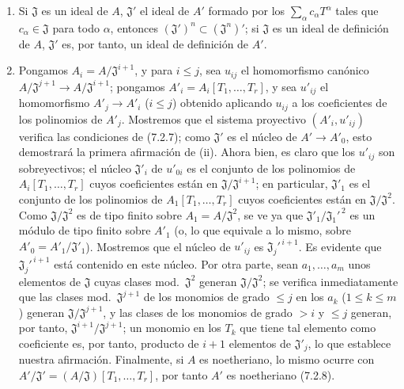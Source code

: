 \begin{enumerate}
  \item[(i)] Si $\mathfrak J$ es un ideal de $A$, $\mathfrak J'$ el ideal de
  $A'$ formado por los $\sum_\alpha c_\alpha T^\alpha$ tales que
  $c_\alpha\in\mathfrak J$ para todo $\alpha$, entonces
  $(\mathfrak J')^n\subset(\mathfrak J^n)'$; si $\mathfrak J$ es un ideal de
  definición de $A$, $\mathfrak J'$ es, por tanto, un ideal de definición de $A'$.

  \item[(ii)] Pongamos $A_i=A/\mathfrak J^{i+1}$, y para $i\leq j$, sea
  $u_{ij}$ el homomorfismo canónico
  $A/\mathfrak J^{j+1}\to A/\mathfrak J^{i+1}$; pongamos
  $A'_i=A_i[T_1,\ldots,T_r]$, y sea $u'_{ij}$ el homomorfismo
  $A'_j\to A'_i$ ($i\leq j$) obtenido aplicando $u_{ij}$ a los coeficientes
  de los polinomios de $A'_j$. Mostremos que el sistema proyectivo
  $(A'_i,u'_{ij})$ verifica las condiciones de (7.2.7); como $\mathfrak J'$ es
  el núcleo de $A'\to A'_0$, esto demostrará la primera afirmación de (ii). Ahora bien,
  es claro que los $u'_{ij}$ son sobreyectivos; el núcleo $\mathfrak J'_i$
  de $u'_{0i}$ es el conjunto de los polinomios de
  $A_i[T_1,\ldots,T_r]$ cuyos coeficientes están en
  $\mathfrak J/\mathfrak J^{i+1}$; en particular, $\mathfrak J'_1$ es
  el conjunto de los polinomios de $A_1[T_1,\ldots,T_r]$ cuyos coeficientes
  están en $\mathfrak J/\mathfrak J^2$. Como $\mathfrak J/\mathfrak J^2$
  es de tipo finito sobre $A_1=A/\mathfrak J^2$, se ve ya que
  $\mathfrak J'_1/\mathfrak J_1'^{\,2}$ es un módulo de tipo finito sobre $A'_1$
  (o, lo que equivale a lo mismo, sobre
  $A'_0=A'_1/\mathfrak J'_1$). Mostremos que el núcleo de $u'_{ij}$ es
  $\mathfrak J_j'^{\,i+1}$. Es evidente que
  $\mathfrak J_j'^{\,i+1}$ está contenido en este núcleo. Por otra parte, sean
  $a_1,\ldots,a_m$ unos elementos de $\mathfrak J$ cuyas clases
  mod.~$\mathfrak J^2$ generan $\mathfrak J/\mathfrak J^2$; se verifica
  inmediatamente que las clases mod.~$\mathfrak J^{j+1}$ de los monomios de grado
  $\leq j$ en los $a_k$ ($1\leq k\leq m$) generan
  $\mathfrak J/\mathfrak J^{j+1}$, y las clases de los monomios de grado $>i$
  y $\leq j$ generan, por tanto,
  $\mathfrak J^{i+1}/\mathfrak J^{j+1}$; un monomio en los $T_k$ que tiene tal
  elemento como coeficiente es, por tanto, producto de $i+1$ elementos de
  $\mathfrak J'_j$, lo que establece nuestra afirmación. Finalmente, si $A$ es
  noetheriano, lo mismo ocurre con
  $A'/\mathfrak J'=(A/\mathfrak J)[T_1,\ldots,T_r]$, por tanto $A'$ es noetheriano
  (7.2.8).
\end{enumerate}

